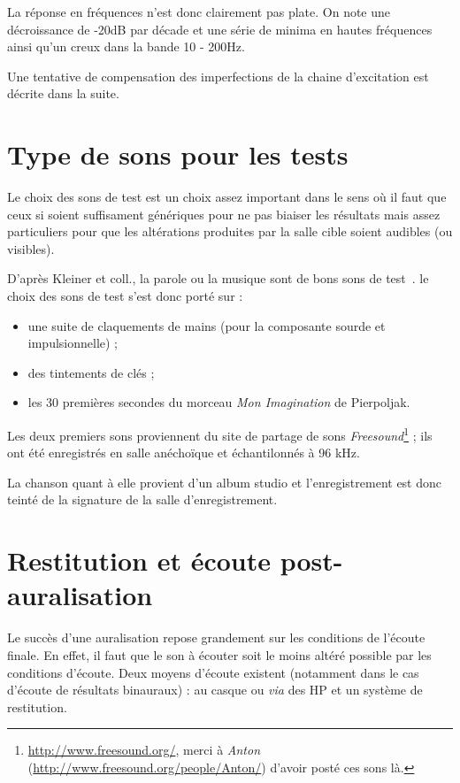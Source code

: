 La réponse en fréquences n'est donc clairement pas plate. On note une décroissance de -20dB par décade et une série de
minima en hautes fréquences ainsi qu'un creux dans la bande 10 - 200Hz.

Une tentative de compensation des imperfections de la chaine d'excitation est décrite dans la suite.


\section{Type de sons pour les tests} %

Le choix des sons de test est un choix assez important dans le sens où il faut que ceux si soient suffisament génériques
pour ne pas biaiser les résultats mais assez particuliers pour que les altérations produites par la salle cible soient
audibles (ou visibles).

D'après Kleiner et coll., la parole ou la musique sont de bons sons de test~\cite{Kle93}. le choix des sons de test
s'est donc porté sur :

\begin{itemize}
    \item une suite de claquements de mains (pour la composante sourde et impulsionnelle) ;
    \item des tintements de clés ;
    \item les 30 premières secondes du morceau \textit{Mon Imagination} de Pierpoljak.
\end{itemize}

Les deux premiers sons proviennent du site de partage de sons
\textit{Freesound}\footnote{\url{http://www.freesound.org/}, merci à \textit{Anton}
(\url{http://www.freesound.org/people/Anton/}) d'avoir posté ces sons là.} ; ils ont été enregistrés en salle anéchoïque
et échantilonnés à 96 kHz.

La chanson quant à elle provient d'un album studio et l'enregistrement est donc teinté de la signature de la salle
d'enregistrement.

\section{Restitution et écoute post-auralisation} %

Le succès d'une auralisation repose grandement sur les conditions de l'écoute finale. En effet, il faut que le son à
écouter soit le moins altéré possible par les conditions d'écoute. Deux moyens d'écoute existent (notamment dans le cas
d'écoute de résultats binauraux) : au casque ou \textit{via} des HP et un système de restitution. 

